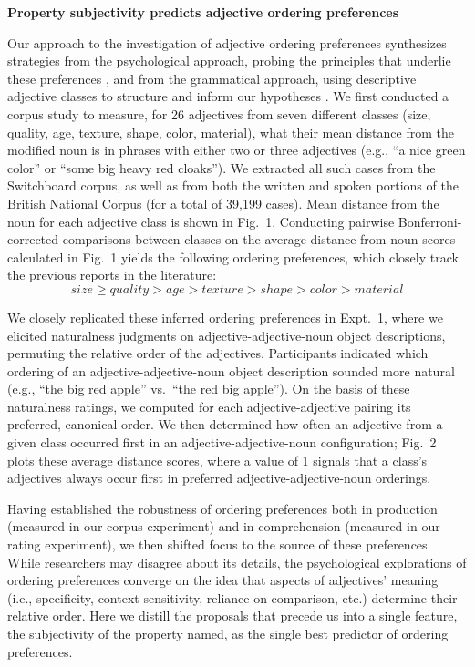\documentclass[12pt]{article}
\begin{document}
\begin{center}\textbf{Property subjectivity predicts adjective ordering preferences}
\end{center}
	
Our approach to the investigation of adjective ordering preferences synthesizes strategies from the psychological approach, probing the principles that underlie these preferences \cite{sweet1898,ziff1960,martin1969determinants,martin1969competence,martin1970,kemmereretal2009}, and from the grammatical approach, using descriptive adjective classes to structure and inform our hypotheses \cite{dixon1982,sproatshih1991,cinque1994,scott2002}. We first conducted a corpus study to measure, for 26 adjectives from seven different classes (size, quality, age, texture, shape, color, material), what their mean distance from the modified noun is in phrases with either two or three adjectives (e.g., ``a nice green color'' or ``some big heavy red cloaks''). We extracted all such cases from the Switchboard corpus, as well as from both the written and spoken portions of the British National Corpus (for a total of 39,199 cases). Mean distance from the noun for each adjective class is shown in Fig.~1.
Conducting pairwise Bonferroni-corrected comparisons between classes on the average distance-from-noun scores calculated in Fig.~1 yields the following ordering preferences, which closely track the previous reports in the literature:
$$ size \geq quality > age > texture > shape > color > material \label{inferred-order-preferences}$$

We closely replicated these inferred ordering preferences in Expt.~1, where we elicited naturalness judgments on adjective-adjective-noun object descriptions, permuting the relative order of the adjectives. Participants indicated which ordering of an adjective-adjective-noun object description sounded more natural (e.g., ``the big red apple'' vs.\ ``the red big apple''). On the basis of these naturalness ratings, we computed for each adjective-adjective pairing its preferred, canonical order. We then determined how often an adjective from a given class occurred first in an adjective-adjective-noun configuration; Fig.~2 plots these average distance scores, where a value of 1 signals that a class's adjectives always occur first in preferred adjective-adjective-noun orderings. 

Having established the robustness of ordering preferences both in production (measured in our corpus experiment) and in comprehension (measured in our rating experiment), we then shifted focus to the source of these preferences. While researchers may disagree about its details, the psychological explorations of ordering preferences converge on the idea that aspects of  adjectives' meaning (i.e., specificity, context-sensitivity, reliance on comparison, etc.) determine their relative order.  Here we distill the proposals that precede us into a single feature, the subjectivity of the property named, as the single best predictor of ordering preferences. 
\end{document}
